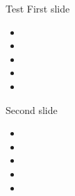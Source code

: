 \documentclass[aspectratio=169]{beamer}
\begin{document}
\begin{frame}[allowframebreaks]{Test}
  First slide
  \begin{itemize}
    \item
    \item
    \item
    \item
    \item
  \end{itemize}
  \framebreak
  Second slide
  \begin{itemize}
    \item
    \item
    \item
    \item
    \item
  \end{itemize}
\end{frame}
\end{document}
